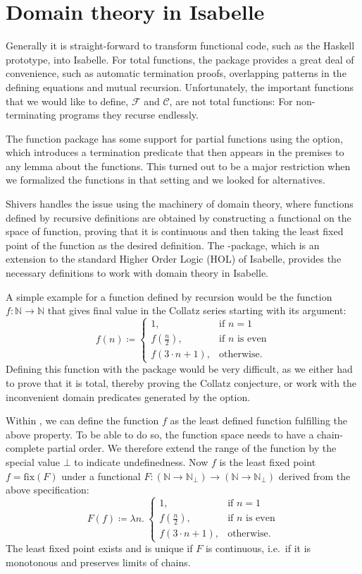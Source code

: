 \documentclass[a4paper,parskip=half,BCOR=8mm,DIV=calc,12pt]{scrbook}
\newcommand{\C}{\mathcal C}
\newcommand{\F}{\mathcal F}
\newcommand{\N}{\mathds N}
\newcommand{\da}{\coloneqq}
\begin{document}
\section{Domain theory in Isabelle}

Generally it is straight-forward to transform functional code, such as the Haskell prototype, into Isabelle. For total functions, the  package\citep{isabelle-function} provides a great deal of convenience, such as automatic termination proofs, overlapping patterns in the defining equations and mutual recursion. Unfortunately, the important functions that we would like to define, $\F$ and $\C$, are not total functions: For non-terminating programs they recurse endlessly.

The function package has some support for partial functions using the  option, which introduces a termination predicate that then appears in the premises to any lemma about the functions. This turned out to be a major restriction when we formalized the functions in that setting and we looked for alternatives.

Shivers handles the issue using the machinery of domain theory, where functions defined by recursive definitions are obtained by constructing a functional on the space of function, proving that it is continuous and then taking the least fixed point of the function as the desired definition. The -package\citep{HOLCF}, which is an extension to the standard Higher Order Logic (HOL) of Isabelle, provides the necessary definitions to work with domain theory in Isabelle.

A simple example for a function defined by recursion would be the function $f\colon \N \to \N$ that gives final value in the Collatz series starting with its argument:
\[
f(n) \da 
\begin{cases}
1, &\text{if } n = 1\\
f(\frac n 2), &\text{if $n$ is even} \\
f(3\cdot n + 1), &\text{otherwise}.
\end{cases}
\]
Defining this function with the  package would be very difficult, as we either had to prove that it is total, thereby proving the Collatz conjecture, or work with the inconvenient domain predicates generated by the  option.

Within , we can define the function $f$ as the least defined function fulfilling the above property. To be able to do so, the function space needs to have a chain-complete partial order. We therefore extend the range of the function by the special value $\bot$ to indicate undefinedness. Now $f$ is the least fixed point $f = \text{fix}(F)$ under a functional $F\colon (\N \to \N_\bot) \to (\N \to \N_\bot)$ derived from the above specification:
\[
F(f) \da \lambda n.\ 
\begin{cases}
1, &\text{if } n = 1\\
f(\frac n 2), &\text{if $n$ is even} \\
f(3\cdot n + 1), &\text{otherwise}.
\end{cases}
\]
The least fixed point exists and is unique if $F$ is continuous, i.e.\ if it is monotonous and preserves limits of chains.
\end{document}
